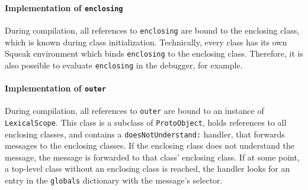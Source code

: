 \paragraph{Implementation of \texttt{enclosing}}
During compilation, all references to \texttt{enclosing} are bound to the enclosing class, which is known during class initialization. Technically, every class has its own Squeak environment which binds \texttt{enclosing} to the enclosing class. Therefore, it is also possible to evaluate \texttt{enclosing} in the debugger, for example.

\paragraph{Implementation of \texttt{outer}}
During compilation, all references to \texttt{outer} are bound to an instance of \texttt{LexicalScope}. This class is a subclass of \texttt{ProtoObject}, holds references to all enclosing classes, and contains a \texttt{doesNotUnderstand:} handler, that forwards messages to the enclosing classes. If the enclosing class does not understand the message, the message is forwarded to that class' enclosing class. If at some point, a top-level class without an enclosing class is reached, the handler looks for an entry in the \texttt{globals} dictionary with the message's selector.


